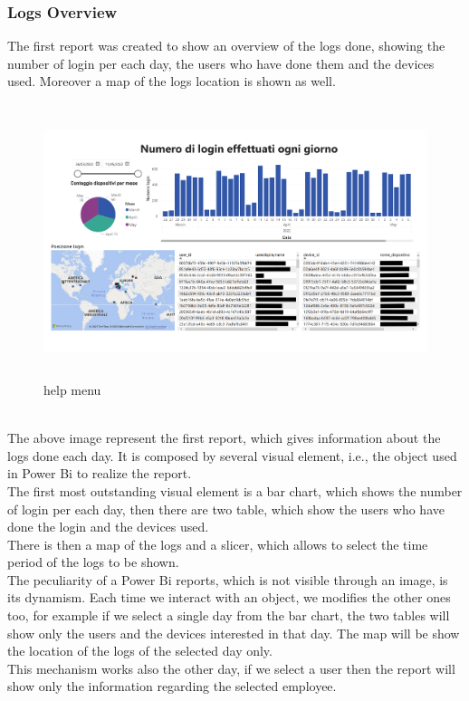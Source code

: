 \documentclass[12pt, a4paper, oneside]{article}
\begin{document}
\subsubsection{Logs Overview}
The first report was created to show an overview of the logs done, showing the number of login per each day, the users who have done them and the devices used. Moreover a map of the logs location is shown as
well.
\begin{figure}[h]
    \centering
    \includegraphics[width=\textwidth, height=8cm]{log-per-day.png}
    \caption{help menu}
\end{figure}\\
The above image represent the first report, which gives information about the logs done each day. It is composed by several visual element, i.e., the object used in Power Bi to realize the report.\\
The first most outstanding visual element is a bar chart, which shows the number of login per each day, then there are two table, which show the users who have done the login and the devices used.\\
There is then a map of the logs and a slicer, which allows to select the time period of the logs to be shown.\\
The peculiarity of a Power Bi reports, which is not visible through an image, is its dynamism. Each time we interact with an object, we modifies the other ones too, for example if we select a single day from the
bar chart, the two tables will show only the users and the devices interested in that day. The map will be show the location of the logs of the selected day only.\\
This mechanism works also the other day, if we select a user then the report will show only the information regarding the selected employee.\\
\end{document}
